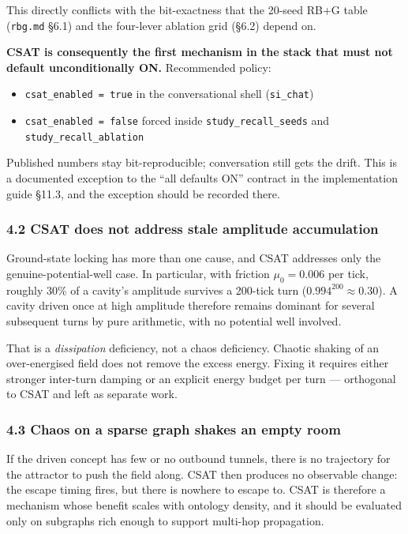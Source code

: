 \documentclass[
  11pt,
  a4paper,
]{article}
\providecommand{\tightlist}{%
  \setlength{\itemsep}{0pt}\setlength{\parskip}{0pt}}
\begin{document}
This directly conflicts with the bit-exactness that the 20-seed RB+G
table (\texttt{rbg.md} §6.1) and the four-lever ablation grid (§6.2)
depend on.

\textbf{CSAT is consequently the first mechanism in the stack that must
not default unconditionally ON.} Recommended policy:

\begin{itemize}
\tightlist
\item
  \texttt{csat\_enabled\ =\ true} in the conversational shell
  (\texttt{si\_chat})
\item
  \texttt{csat\_enabled\ =\ false} forced inside
  \texttt{study\_recall\_seeds} and \texttt{study\_recall\_ablation}
\end{itemize}

Published numbers stay bit-reproducible; conversation still gets the
drift. This is a documented exception to the ``all defaults ON''
contract in the implementation guide §11.3, and the exception should be
recorded there.

\subsubsection{4.2 CSAT does not address stale amplitude
accumulation}\label{csat-does-not-address-stale-amplitude-accumulation}

Ground-state locking has more than one cause, and CSAT addresses only
the genuine-potential-well case. In particular, with friction
\(\mu_0 = 0.006\) per tick, roughly \(30\%\) of a cavity's amplitude
survives a 200-tick turn (\(0.994^{200} \approx 0.30\)). A cavity driven
once at high amplitude therefore remains dominant for several subsequent
turns by pure arithmetic, with no potential well involved.

That is a \emph{dissipation} deficiency, not a chaos deficiency. Chaotic
shaking of an over-energised field does not remove the excess energy.
Fixing it requires either stronger inter-turn damping or an explicit
energy budget per turn --- orthogonal to CSAT and left as separate work.

\subsubsection{4.3 Chaos on a sparse graph shakes an empty
room}\label{chaos-on-a-sparse-graph-shakes-an-empty-room}

If the driven concept has few or no outbound tunnels, there is no
trajectory for the attractor to push the field along. CSAT then produces
no observable change: the escape timing fires, but there is nowhere to
escape to. CSAT is therefore a mechanism whose benefit scales with
ontology density, and it should be evaluated only on subgraphs rich
enough to support multi-hop propagation.
\end{document}

